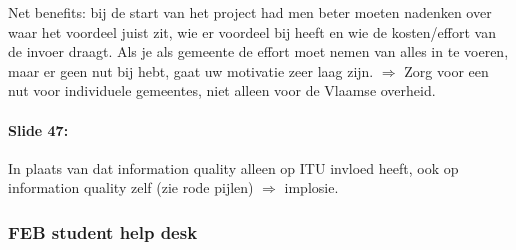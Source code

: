 \documentclass[10pt,a4paper]{report}
\begin{document}
\begin{itemize}
Net benefits: bij de start van het project had men beter moeten nadenken over waar het voordeel juist zit, wie er voordeel bij heeft en wie de kosten/effort van de invoer draagt. Als je als gemeente de effort moet nemen van alles in te voeren, maar er geen nut bij hebt, gaat uw motivatie zeer laag zijn. $\Rightarrow$ Zorg voor een nut voor individuele gemeentes, niet alleen voor de Vlaamse overheid.
\end{itemize}

\paragraph{Slide 47:}In plaats van dat information quality alleen op ITU invloed heeft, ook op information quality zelf (zie rode pijlen) $\Rightarrow$ implosie.

\subsubsection{FEB student help desk}
\end{document}
